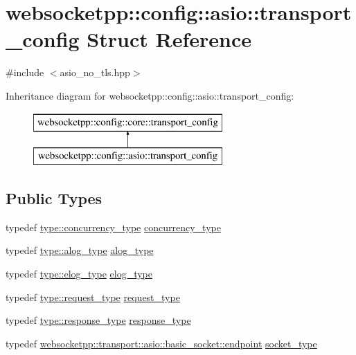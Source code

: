 \hypertarget{structwebsocketpp_1_1config_1_1asio_1_1transport__config}{}\section{websocketpp\+:\+:config\+:\+:asio\+:\+:transport\+\_\+config Struct Reference}
\label{structwebsocketpp_1_1config_1_1asio_1_1transport__config}


{\ttfamily \#include $<$asio\+\_\+no\+\_\+tls.\+hpp$>$}

Inheritance diagram for websocketpp\+:\+:config\+:\+:asio\+:\+:transport\+\_\+config\+:\begin{figure}[H]
\begin{center}
\leavevmode
\includegraphics[height=2.000000cm]{structwebsocketpp_1_1config_1_1asio_1_1transport__config}
\end{center}
\end{figure}
\subsection*{Public Types}
\begin{DoxyCompactItemize}
\item 
typedef \hyperlink{structwebsocketpp_1_1config_1_1asio_a4f2036249aa6a4a627ac42cc38cdaa06}{type\+::concurrency\+\_\+type} \hyperlink{structwebsocketpp_1_1config_1_1asio_1_1transport__config_a512d44142c4cf52cc732eb13e9901405}{concurrency\+\_\+type}
\item 
typedef \hyperlink{structwebsocketpp_1_1config_1_1asio_a128280d7b2ff8256e10f23050a89549d}{type\+::alog\+\_\+type} \hyperlink{structwebsocketpp_1_1config_1_1asio_1_1transport__config_a524e5797844731f20c0513d6b4857b34}{alog\+\_\+type}
\item 
typedef \hyperlink{structwebsocketpp_1_1config_1_1asio_a67f2a92d70443a37f25ffbc08a6a9c3d}{type\+::elog\+\_\+type} \hyperlink{structwebsocketpp_1_1config_1_1asio_1_1transport__config_a269e16af2262a7b1a9165e488b2dc651}{elog\+\_\+type}
\item 
typedef \hyperlink{structwebsocketpp_1_1config_1_1asio_ab378f1fa9cdbf4736b0202666c9abe53}{type\+::request\+\_\+type} \hyperlink{structwebsocketpp_1_1config_1_1asio_1_1transport__config_a5bd4b592ae10c2c5df22cf894c3db62b}{request\+\_\+type}
\item 
typedef \hyperlink{structwebsocketpp_1_1config_1_1asio_a2336ebfd28c36b1e66257ae57ad5296c}{type\+::response\+\_\+type} \hyperlink{structwebsocketpp_1_1config_1_1asio_1_1transport__config_ac6bbac6039c4723a7a59892b77437697}{response\+\_\+type}
\item 
typedef \hyperlink{classwebsocketpp_1_1transport_1_1asio_1_1basic__socket_1_1endpoint}{websocketpp\+::transport\+::asio\+::basic\+\_\+socket\+::endpoint} \hyperlink{structwebsocketpp_1_1config_1_1asio_1_1transport__config_a7ad5fe6e1bb71633a8d75125a8388c43}{socket\+\_\+type}
\end{DoxyCompactItemize}
